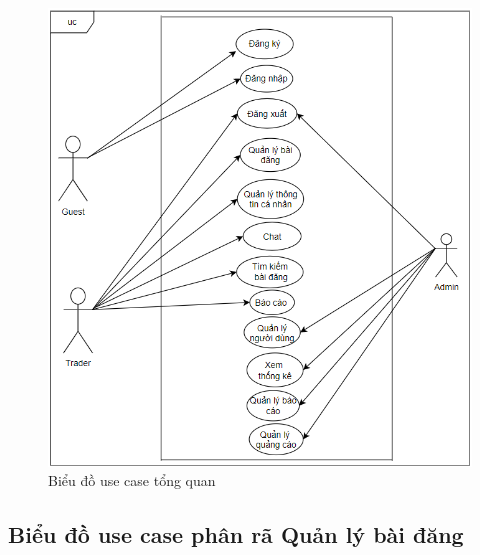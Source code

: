 \documentclass[../DoAn.tex]{subfiles}
\begin{document}
\begin{figure}[h]
\includegraphics[width=0.75\linewidth]{Hinhve/overviewUsecase.png}
\centering
\caption{Biểu đồ use case tổng quan}
\end{figure}
\newpage

\subsection{Biểu đồ use case phân rã Quản lý bài đăng}
\label{subsection:2.2.2}
\end{document}
